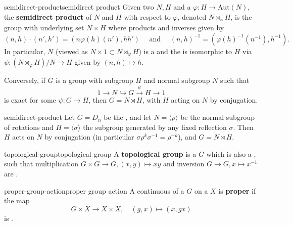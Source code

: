\begin{topic}{semidirect-product}{semidirect product}
    Given two  $N, H$ and a  $\varphi : H \to \text{Aut}(N)$, the \textbf{semidirect product} of $N$ and $H$ with respect to $\varphi$, denoted $N \rtimes_\varphi H$, is the group with underlying set $N \times H$ where products and inverses given by
    \[ (n, h) \cdot (n', h') = (n \varphi(h)(n'), h h') \quad \text{ and } \quad (n, h)^{-1} = (\varphi(h)^{-1}(n^{-1}), h^{-1}) . \]
    In particular, $N$ (viewed as $N \times 1 \subset N \rtimes_\varphi H$) is a  and the  is isomorphic to $H$ via $\psi : (N \rtimes_\varphi H)/N \to H$ given by $(n, h) \mapsto h$.
    
    Conversely, if $G$ is a group with subgroup $H$ and normal subgroup $N$ such that
    \[ 1 \to N \hookrightarrow G \xrightarrow{\psi} H \to 1 \]
    is exact for some $\psi : G \to H$, then $G = N \rtimes H$, with $H$ acting on $N$ by conjugation.
\end{topic}

\begin{example}{semidirect-product}
    Let $G = D_{n}$ be the , and let $N = \langle \rho \rangle$ be the normal subgroup of rotations and $H = \langle \sigma \rangle$ the subgroup generated by any fixed reflection $\sigma$. Then $H$ acts on $N$ by conjugation (in particular $\sigma \rho^k \sigma^{-1} = \rho^{-k}$), and $G = N \rtimes H$.
\end{example}


\begin{topic}{topological-group}{topological group}
    A \textbf{topological group} is a  $G$ which is also a , such that multiplication $G \times G \to G, (x, y) \mapsto xy$ and inversion $G \to G, x \mapsto x^{-1}$ are .
\end{topic}

\begin{topic}{proper-group-action}{proper group action}
    A continuous  of a  $G$ on a  $X$ is \textbf{proper} if the map
    \[ G \times X \to X \times X, \quad (g, x) \mapsto (x, gx) \]
    is .
\end{topic}


